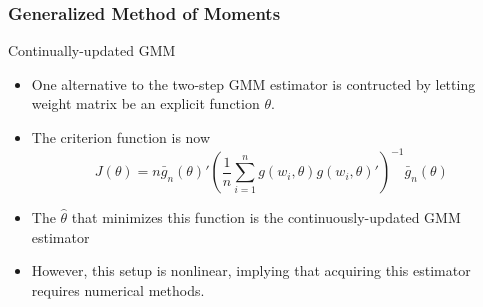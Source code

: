 \documentclass{beamer}
\begin{document}
\begin{frame}
\frametitle{Generalized Method of Moments}
Continually-updated GMM
\begin{itemize}
\item One alternative to the two-step GMM estimator is contructed by letting weight matrix be an explicit function $\theta$. 
\item The criterion function is now
\[
J(\theta)=n\bar{g}_n(\theta)'\left(\frac{1}{n}\sum_{i=1}^n g(w_i,\theta)g(w_i,\theta)'\right)^{-1}\bar{g}_n(\theta)
\]
\item The $\hat{\theta}$ that minimizes this function is the continuously-updated GMM estimator
\item  However, this setup is nonlinear, implying that acquiring this estimator requires numerical methods. 

\end{itemize}
\end{frame}

\end{document}
